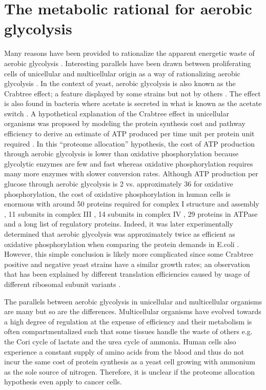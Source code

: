 \section{The metabolic rational for aerobic glycolysis}
Many reasons have been provided to rationalize the apparent energetic waste of aerobic glycolysis \cite{Vander_Heiden2009-uf, OBrien2013-dt, Huberts2012-gk, Zhuang2011-nm, Pfeiffer2001-pu}.
Interesting parallels have been drawn between proliferating cells of unicellular and multicellular origin as a way of rationalizing aerobic glycolysis \cite{Vander_Heiden2009-uf}.
In the context of yeast, aerobic glycolysis is also known as the Crabtree effect; a feature displayed by some strains but not by others \cite{De_Deken1966-bp}.
The effect is also found in bacteria where acetate is secreted in what is known as the acetate switch \cite{Wolfe2005-cy}.
A hypothetical explanation of the Crabtree effect in unicellular organisms was proposed by modeling the protein synthesis cost and pathway efficiency to derive an estimate of ATP produced per time unit per protein unit required \cite{Molenaar2009-go}.
In this ``proteome allocation'' hypothesis, the cost of ATP production through aerobic glycolysis is lower than oxidative phosphorylation because glycolytic enzymes are few and fast whereas oxidative phosphorylation requires many more enzymes with slower conversion rates.
Although ATP production per glucose through aerobic glycolysis is 2 vs. approximately 36 for oxidative phosphorylation, the cost of oxidative phosphorylation in human cells is enormous with around 50 proteins required for complex I structure and assembly \cite{Sharma2009-ws}, 11 subunits in complex III \cite{Iwata1998-td}, 14 subunits in complex IV \cite{Signes2018-df}, 29 proteins in ATPase \cite{He2018-rl} and a long list of regulatory proteins.
Indeed, it was later experimentally determined that aerobic glycolysis was approximately twice as efficient as oxidative phosphorylation when comparing the protein demands in E.coli \cite{Basan2015-bq}.
However, this simple conclusion is likely more complicated since some Crabtree positive and negative yeast strains have a similar growth rates; an observation that has been explained by different translation efficiencies caused by usage of different ribosomal subunit variants \cite{Malina2021-lb}.

The parallels between aerobic glycolysis in unicellular and multicellular organisms are many but so are the differences.
Multicellular organisms have evolved towards a high degree of regulation at the expense of efficiency and their metabolism is often compartmentalized such that some tissues handle the waste of others e.g. the Cori cycle of lactate and the urea cycle of ammonia.
Human cells also experience a constant supply of amino acids from the blood and thus do not incur the same cost of protein synthesis as a yeast cell growing with ammonium as the sole source of nitrogen.
Therefore, it is unclear if the proteome allocation hypothesis even apply to cancer cells.


